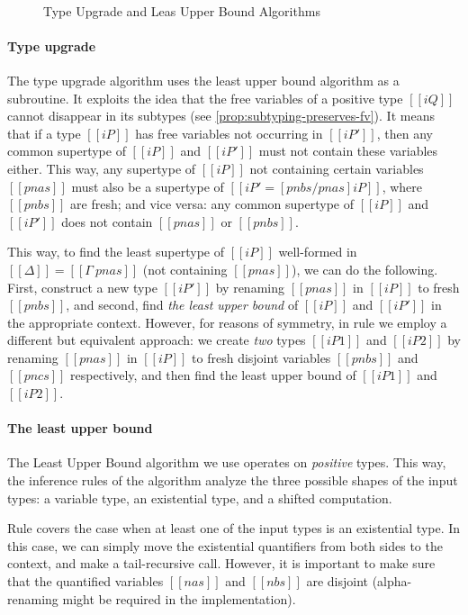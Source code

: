 \begin{figure}[t]
  \begin{multicols}{2}
    \ottdefnLUBUpLabeled{}
    \columnbreak\\
    \ottdefnLUBNsubLabeled{}
  \end{multicols}
  \caption{Type Upgrade and Leas Upper Bound Algorithms}
  \label{fig:type-upgrade}
\end{figure}

\paragraph*{Type upgrade}
The type upgrade algorithm uses the least upper bound algorithm as a subroutine.
It exploits the idea that the free variables of a positive type $[[iQ]]$
cannot disappear in its subtypes (see \cref{prop:subtyping-preserves-fv}). 
It means that if 
a type $[[iP]]$ has free variables not occurring 
in $[[iP']]$, then any common supertype of $[[iP]]$
and $[[iP']]$ must not contain these variables either.
This way, any supertype of $[[iP]]$
not containing certain variables $[[pnas]]$ must also be 
a supertype of $[[iP' = [pnbs/pnas]iP ]]$, where $[[pnbs]]$ are fresh;
and vice versa: any common supertype of $[[iP]]$ and $[[iP']]$
does not contain $[[pnas]]$ or $[[pnbs]]$.

This way, to find the least supertype of $[[iP]]$ well-formed in $[[Δ]] = [[Γ \ {pnas}]]$
(\ie not containing $[[pnas]]$), we can do the following.
First, construct a new type $[[iP']]$ by renaming $[[pnas]]$ in $[[iP]]$ to fresh $[[pnbs]]$,
and second, find \emph{the least upper bound} of $[[iP]]$ and $[[iP']]$ in the appropriate
context. However, for reasons of symmetry, in rule
 we employ a different but equivalent approach:
we create \emph{two} types $[[iP1]]$ and $[[iP2]]$ by renaming $[[pnas]]$ in $[[iP]]$
to fresh disjoint variables $[[pnbs]]$ and $[[pncs]]$ respectively, and then 
find the least upper bound of $[[iP1]]$ and $[[iP2]]$.

\paragraph*{The least upper bound}
The Least Upper Bound algorithm we use operates on \emph{positive}
types. This way, the inference rules of the algorithm
analyze the three possible shapes of the input types:
a variable type, an existential type, and a shifted computation.

 Rule  covers the case when 
 at least one of the input types is an existential type.
 In this case, we can simply move the existential quantifiers
 from both sides to the context, and make a tail-recursive call.
 However, it is important to make sure that 
 the quantified variables $[[nas]]$ and $[[nbs]]$ are disjoint
 (\ie alpha-renaming might be required in the implementation).
  
